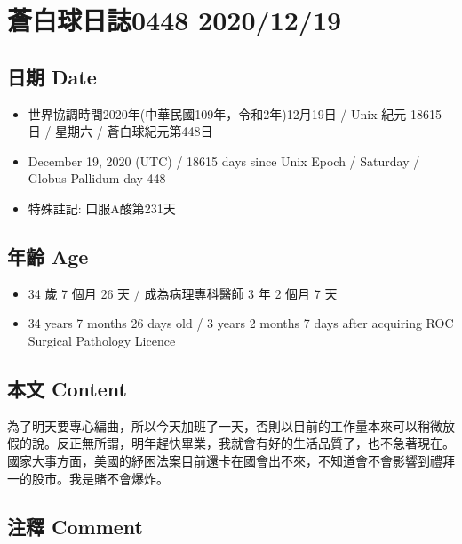 \documentclass[a5paper, 11pt
]{book}
\providecommand{\tightlist}{%
  \setlength{\itemsep}{0pt}\setlength{\parskip}{0pt}}
\begin{document}
\hypertarget{ux84bcux767dux7403ux65e5ux8a8c0448-20201219}{%
\section{蒼白球日誌0448
2020/12/19}\label{ux84bcux767dux7403ux65e5ux8a8c0448-20201219}}

\hypertarget{ux65e5ux671f-date-18}{%
\subsection{日期 Date}\label{ux65e5ux671f-date-18}}

\begin{itemize}
\tightlist
\item
  世界協調時間2020年(中華民國109年，令和2年)12月19日 / Unix 紀元 18615
  日 / 星期六 / 蒼白球紀元第448日
\item
  December 19, 2020 (UTC) / 18615 days since Unix Epoch / Saturday /
  Globus Pallidum day 448
\item
  特殊註記: 口服A酸第231天
\end{itemize}

\hypertarget{ux5e74ux9f61-age-18}{%
\subsection{年齡 Age}\label{ux5e74ux9f61-age-18}}

\begin{itemize}
\tightlist
\item
  34 歲 7 個月 26 天 / 成為病理專科醫師 3 年 2 個月 7 天
\item
  34 years 7 months 26 days old / 3 years 2 months 7 days after
  acquiring ROC Surgical Pathology Licence
\end{itemize}

\hypertarget{ux672cux6587-content-18}{%
\subsection{本文 Content}\label{ux672cux6587-content-18}}

為了明天要專心編曲，所以今天加班了一天，否則以目前的工作量本來可以稍微放假的說。反正無所謂，明年趕快畢業，我就會有好的生活品質了，也不急著現在。國家大事方面，美國的紓困法案目前還卡在國會出不來，不知道會不會影響到禮拜一的股市。我是賭不會爆炸。

\hypertarget{ux6ce8ux91cb-comment-18}{%
\subsection{注釋 Comment}\label{ux6ce8ux91cb-comment-18}}
\end{document}
